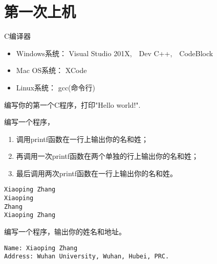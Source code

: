 \section{第一次上机}

\begin{frame}
  C编译器
  \begin{itemize}
  \item Windows系统： Visual Studio 201X,~~Dev C++,~~CodeBlock
  \item Mac OS系统： XCode
  \item Linux系统： gcc(命令行)
  \end{itemize}
\end{frame}

\begin{frame}[fragile]\ft{\secname}
  \begin{wenti}
    编写你的第一个C程序，打印"Hello world!". 
  \end{wenti}
\end{frame}

\begin{frame}[fragile]\ft{\secname}
\begin{wenti}  
编写一个程序，
\begin{enumerate}
\item 调用printf函数在一行上输出你的名和姓；
\item 再调用一次printf函数在两个单独的行上输出你的名和姓；
\item 最后调用两次printf函数在一行上输出你的名和姓。

\end{enumerate}
\end{wenti}

\begin{lstlisting}
Xiaoping Zhang  
Xiaoping        
Zhang           
Xiaoping Zhang  
\end{lstlisting}

\end{frame}

\begin{frame}[fragile]\ft{\secname}
\begin{wenti}
编写一个程序，输出你的姓名和地址。
\end{wenti}

\begin{lstlisting}
Name: Xiaoping Zhang  
Address: Wuhan University, Wuhan, Hubei, PRC.  
\end{lstlisting}

\end{frame}

